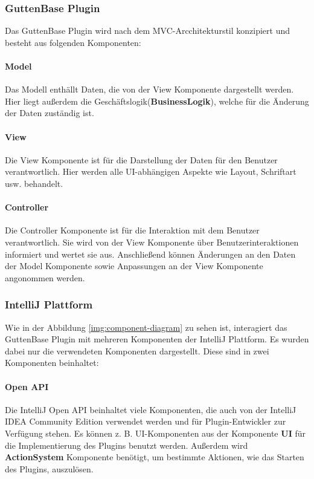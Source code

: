 	
	\subsubsection{GuttenBase Plugin}
	Das GuttenBase Plugin wird nach dem MVC-Arcchitekturstil konzipiert und besteht aus folgenden Komponenten:
	
	\paragraph*{Model}
	Das Modell enthällt Daten, die von der View Komponente dargestellt werden. Hier liegt außerdem die Geschäftslogik(\textbf{BusinessLogik}), welche für die Änderung der Daten zuständig ist.
	
	\paragraph*{View}
	Die View Komponente ist für die Darstellung der Daten für den Benutzer verantwortlich. Hier werden alle UI-abhängigen Aspekte wie Layout, Schriftart usw. behandelt.\\
	
	\paragraph*{Controller}
	Die Controller Komponente ist für die Interaktion mit dem Benutzer verantwortlich. Sie wird von der View Komponente über Benutzerinteraktionen informiert und wertet sie aus. Anschließend können Änderungen an den Daten der Model Komponente sowie Anpassungen an der View Komponente angonommen werden.
	
	\subsubsection{IntelliJ Plattform}
	Wie in der Abbildung \ref{img:component-diagram} zu sehen ist, interagiert das GuttenBase Plugin mit mehreren Komponenten der IntelliJ Plattform. 
	Es wurden dabei nur die verwendeten Komponenten dargestellt. Diese sind in zwei Komponenten beinhaltet:
	
	\paragraph*{Open API}
	Die IntelliJ Open API beinhaltet viele Komponenten, die auch von der IntelliJ IDEA Community Edition verwendet werden und für Plugin-Entwickler zur Verfügung stehen. Es können z. B. UI-Komponenten aus der Komponente \textbf{UI} für die Implementierung des Plugins benutzt werden. Außerdem wird \textbf{ActionSystem} Komponente benötigt, um bestimmte Aktionen, wie das Starten des Plugins, auszulösen.
